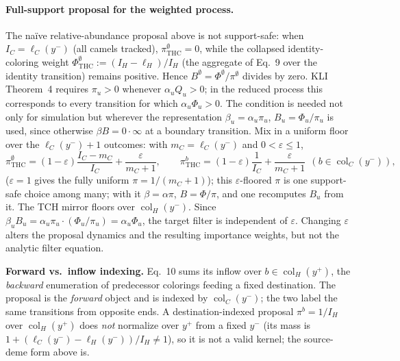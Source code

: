 \documentclass[11pt]{article}
\newcommand{\col}{\operatorname{col}}
\theoremstyle{plain}
\begin{document}
\paragraph{Full-support proposal for the weighted process.} The na\"{i}ve relative-abundance
proposal above is not support-safe: when $I_C=\ell_C(y^-)$ (all camels tracked),
$\pi^\emptyset_{\mathrm{THC}}=0$, while the collapsed identity-coloring weight
$\Phi^\emptyset_{\mathrm{THC}}:=(I_H-\ell_H)/I_H$ (the aggregate of Eq.~9 over the identity transition)
remains positive. Hence $B^\emptyset=\Phi^\emptyset/\pi^\emptyset$ divides by zero. KLI Theorem~4 requires $\pi_u>0$ whenever $\alpha_uQ_u>0$; in the reduced process this corresponds
to every transition for which $\alpha_u\Phi_u>0$. The condition is needed not only for simulation but wherever the representation
$\beta_u=\alpha_u\pi_u$, $B_u=\Phi_u/\pi_u$ is used, since otherwise $\beta B=0\cdot\infty$ at a boundary
transition. Mix in a uniform floor over the $\ell_C(y^-)+1$ outcomes: with $m_C=\ell_C(y^-)$ and
$0<\varepsilon\le1$,
\[
\pi^\emptyset_{\mathrm{THC}}=(1-\varepsilon)\frac{I_C-m_C}{I_C}+\frac{\varepsilon}{m_C+1},\qquad
\pi^b_{\mathrm{THC}}=(1-\varepsilon)\frac1{I_C}+\frac{\varepsilon}{m_C+1}\ \ (b\in\col_C(y^-)),
\]
($\varepsilon=1$ gives the fully uniform $\pi=1/(m_C+1)$); this $\varepsilon$-floored $\pi$ is
one support-safe choice among many; with it $\beta=\alpha\pi$, $B=\Phi/\pi$, and one recomputes $B_u$ from it. The TCH mirror
floors over $\col_H(y^-)$. Since $\beta_uB_u=\alpha_u\pi_u\cdot(\Phi_u/\pi_u)=\alpha_u\Phi_u$, the target filter is independent of $\varepsilon$. Changing $\varepsilon$ alters the proposal dynamics and the resulting importance weights, but not the analytic filter equation.

\begin{notebox}
\textbf{Forward vs.\ inflow indexing.} Eq.~10 sums its inflow over $b\in\col_H(y^+)$, the \emph{backward} enumeration of predecessor colorings feeding a fixed destination. The proposal is the
\emph{forward} object and is indexed by $\col_C(y^-)$; the two label the same transitions from opposite
ends. A destination-indexed proposal $\pi^b=1/I_H$ over $\col_H(y^+)$ does \emph{not} normalize over
$y^+$ from a fixed $y^-$ (its mass is $1+(\ell_C(y^-)-\ell_H(y^-))/I_H\neq1$), so it is not a valid
kernel; the source-deme form above is.
\end{notebox}
\end{document}

